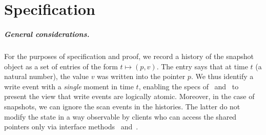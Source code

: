 \documentclass[a4paper,UKenglish]{lipics-v2016}
\newcommand{\hist}{\chi}
\newcommand{\wInit}{\mathsf{W_{Off}}}
\newcommand{\wWrite}{\mathsf{New}}
\newcommand{\wDirty}{\mathsf{Fwd}}
\newcommand{\wClean}{\mathsf{Done}}
\newcommand{\sOn}{\mathsf{S_{On}}}
\newcommand{\sOff}{\mathsf{S_{Off}}}
\theoremstyle{definition}
\begin{document}
%


\section{Specification}
\label{sc:formal}


\def\histx{\hist_\x}
\def\histy{\hist_\y}
\def\histp{\hist_p}

\newcommand{\sx}{S_\x}
\newcommand{\sy}{S_\y}
\newcommand{\spp}{S_p}
\newcommand{\sss}{S_s}
\newcommand{\wx}{W_\x}
\newcommand{\wy}{W_\y}
\newcommand{\wpp}{W_p}


\def\toff{t_{\mathsf{off}}}




\subparagraph*{General considerations.}
%
For the purposes of specification and proof, we record a history of
the snapshot object as a set of entries of the form $t \mapsto (p,
v)$. The entry says that at time $t$ (a natural number), the value $v$
was written into the pointer $p$. We thus identify a write event with
a \emph{single} moment in time $t$, enabling the specs of
\jywrite\ and \jyscan\ to present the view that write events are
logically atomic.
%
Moreover, in the case of snapshots, we can ignore the scan events in
the histories. The latter do not modify the state in a way observable
by clients who can access the shared pointers only via interface
methods \jywrite\ and\ \jyscan.
\end{document}
